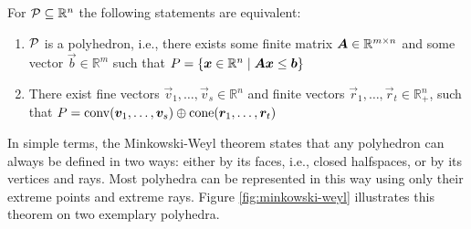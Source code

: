 \begin{theorem}\label{th:minkowski-weyl}
For $\mathcal{P} \subseteq \mathbb{R}^n$ the following statements are equivalent:

\begin{enumerate}
\item $\mathcal{P}$ is a polyhedron, i.e., there exists some finite matrix ${\bm{A}} \in \mathbb{R}^{m \times n}$ and some vector $\vec{b} \in \mathbb{R}^m$ such that $P = \{{\bm{x}} \in \mathbb{R}^n \mid {\bm{A}} {\bm{x}} \leq {\bm{b}}\}$
\item There exist fine vectors $\vec{v}_1, \dots, \vec{v}_s \in \mathbb{R}^n$ and finite vectors $\vec{r}_1, \dots, \vec{r}_t \in \mathbb{R}_+^n$, such that $P = \operatorname{conv}({\bm{v}}_1, \dots, {\bm{v}}_s) \oplus \operatorname{cone}({\bm{r}}_1, \dots, {\bm{r}}_t)$
\end{enumerate}
\end{theorem}

In simple terms, the Minkowski-Weyl theorem states that any polyhedron can always be defined in two ways: either by its faces, i.e., closed halfspaces, or by its vertices and rays. Most polyhedra can be represented in this way using only their extreme points and extreme rays. Figure \ref{fig:minkowski-weyl} illustrates this theorem on two exemplary polyhedra.

